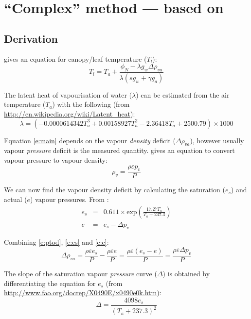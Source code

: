 \documentclass[a4paper]{article}
\begin{document}
\section{``Complex'' method --- based on \citet{thornley90}}


\subsection{Derivation}

\citet[p.~418]{thornley90} gives an equation for canopy/leaf temperature ($T_l$):
\begin{equation}
\label{e:main}
T_l =  T_a + \frac{\phi_N - \lambda g_w \Delta \rho_{va}}{\lambda \left(s g_w + \gamma g_a\right)}
\end{equation}

The latent heat of vapourisation of water ($\lambda$) can be estimated from the air temperature 
($T_a$) with the following (from \url{http://en.wikipedia.org/wiki/Latent_heat}):
\begin{equation}
\lambda = (-0.0000614342 T_a^3 + 0.00158927 T_a^2 - 2.36418 T_a + 2500.79) \times 1000
\end{equation}

Equation \eqref{e:main} depends on the vapour \emph{density} deficit ($\Delta \rho_{va}$), however 
usually vapour \emph{pressure} deficit is the measured quantity.  \citet[p.~409]{thornley90} gives 
an equation to convert vapour pressure to vapour density:
\begin{equation}
\label{e:ptod}
\rho_v = \frac{\rho \varepsilon p_v}{P}
\end{equation}

We can now find the vapour density deficit by calculating the saturation ($e_s$) and actual ($e$) 
    vapour pressures.  From \citet[p.~10]{monteith90}:
\begin{eqnarray}
\label{e:es}
e_s & = & 0.611 \times \text{exp}\left(\frac{17.27 T_a}{T_a + 237.3}\right) \\
e & = & e_s - \Delta p_v
\end{eqnarray}

Combining \eqref{e:ptod}, \eqref{e:es} and \eqref{e:e}:
\begin{equation}
\label{e:e}
\Delta \rho_{va} = \frac{\rho \varepsilon e_s}{P} - \frac{\rho \varepsilon e}{P} = \frac{\rho 
    \varepsilon (e_s - e)}{P} = \frac{\rho \varepsilon \Delta p_v}{P}
\end{equation}

The slope of the saturation vapour \emph{pressure} curve ($\Delta$) is obtained by differentiating 
the equation for $e_s$ (from \url{http://www.fao.org/docrep/X0490E/x0490e0k.htm}):
\begin{equation}
\label{e:deltavp}
\Delta = \frac{4098 e_s}{(T_a + 237.3)^2}
\end{equation}
\end{document}
